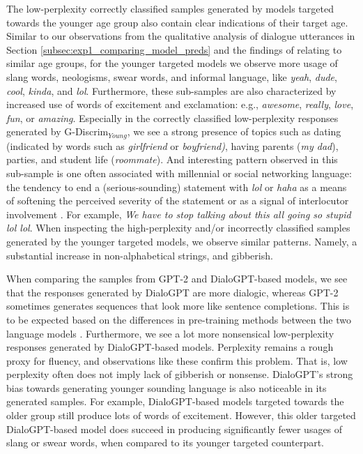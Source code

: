 The low-perplexity correctly classified samples generated by models targeted towards the younger age group also contain clear indications of their target age. Similar to our observations from the qualitative analysis of dialogue utterances in Section \ref{subsec:exp1_comparing_model_preds} and the findings of \cite{schler2006effects} relating to similar age groups, for the younger targeted models we observe more usage of slang words, neologisms, swear words, and informal language, like \textit{yeah}, \textit{dude}, \textit{cool}, \textit{kinda}, and \textit{lol}. 
Furthermore, these sub-samples are also characterized by increased use of words of excitement and exclamation: e.g., \textit{awesome}, \textit{really}, \textit{love}, \textit{fun}, or \textit{amazing}. Especially in the correctly classified low-perplexity responses generated by G-Discrim$_{Young}$, we see a strong presence of topics such as dating (indicated by words such as \textit{girlfriend} or \textit{boyfriend)}, having parents (\textit{my dad}), parties, and student life (\textit{roommate}). And interesting pattern observed in this sub-sample is one often associated with millennial or social networking language: the tendency to end a (serious-sounding) statement with \textit{lol} or \textit{haha} as a means of softening the perceived severity of the statement or as a signal of interlocutor involvement \citep{newitz2019you, tagliamonte2008linguistic}. For example, \textit{We have to stop talking about this all going so stupid lol lol}. When inspecting the high-perplexity and/or incorrectly classified samples generated by the younger targeted models, we observe similar patterns. Namely, a substantial increase in non-alphabetical strings, and gibberish.

When comparing the samples from GPT-2 and DialoGPT-based models, we see that the responses generated by DialoGPT are more dialogic, whereas GPT-2 sometimes generates sequences that look more like sentence completions. This is to be expected based on the differences in pre-training methods between the two language models \citep{zhang2019dialogpt}. Furthermore, we see a lot more nonsensical low-perplexity responses generated by DialoGPT-based models. Perplexity remains a rough proxy for fluency, and observations like these confirm this problem. That is, low perplexity often does not imply lack of gibberish or nonsense. DialoGPT's strong bias towards generating younger sounding language is also noticeable in its generated samples. For example, DialoGPT-based models targeted towards the older group still produce lots of words of excitement. However, this older targeted DialoGPT-based model does succeed in producing significantly fewer usages of slang or swear words, when compared to its younger targeted counterpart.


